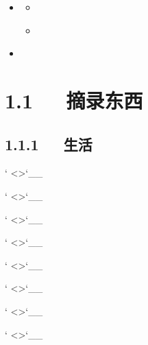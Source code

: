 \documentclass[letterpaper,12pt,english]{sphinxmanual}
\begin{document}
\begin{sphinxShadowBox}
\begin{itemize}
\begin{itemize}
\begin{itemize}
\end{itemize}

\item {} 
\label{\detokenize{000misc/extract:id17}}{\hyperref[\detokenize{000misc/extract:id5}]{}}
\begin{itemize}
\item {} 
\label{\detokenize{000misc/extract:id18}}{\hyperref[\detokenize{000misc/extract:swagger-swaggerrestful}]{}}

\item {} 
\label{\detokenize{000misc/extract:id19}}{\hyperref[\detokenize{000misc/extract:css-h2h3}]{}}

\end{itemize}

\item {} 
\label{\detokenize{000misc/extract:id20}}{\hyperref[\detokenize{000misc/extract:tmp-links}]{}}

\end{itemize}

\end{itemize}
\end{sphinxShadowBox}


\section{1.1   摘录东西}
\label{\detokenize{000misc/extract:id2}}

\subsection{1.1.1   生活}
\label{\detokenize{000misc/extract:id3}}


` <>`\_\_

` <>`\_\_

` <>`\_\_

` <>`\_\_

` <>`\_\_

` <>`\_\_

` <>`\_\_

` <>`\_\_
\end{document}
